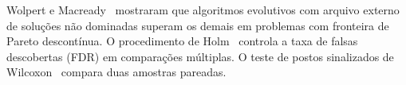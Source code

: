 Wolpert e Macready~\cite{wolpert1997no} mostraram que algoritmos evolutivos com arquivo externo de soluções não dominadas superam os demais em problemas com fronteira de Pareto descontínua. O procedimento de Holm~\cite{holm1979simple} controla a taxa de falsas descobertas (FDR) em comparações múltiplas. O teste de postos sinalizados de Wilcoxon~\cite{wilcoxon1945} compara duas amostras pareadas.
